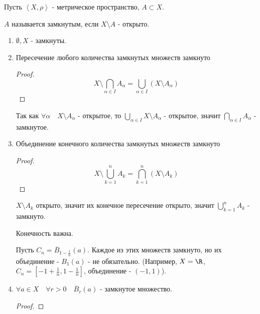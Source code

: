 \begin{definition} \thmslashn 

    Пусть $\left<X, \rho\right>$ - метрическое пространство, $A \subset X$.

    $A$ называется замкнутым, если $X \setminus A$ - открыто. 
\end{definition}
\begin{properties} \thmslashn

    \begin{enumerate}
        \item $ \emptyset, X$ - замкнуты.
        \item Пересечение любого количества замкнутых множеств замкнуто
            \begin{proof} \thmslashn
            
                \begin{equation*}
                        X \setminus \bigcap_{\alpha\in I} A_{\alpha} = \bigcup_{\alpha\in I} (X \setminus A_{\alpha}) 
                \end{equation*}
            \end{proof}

            Так как $\forall{\alpha}\quad X \setminus A_{\alpha}$ - открытое, то $\bigcup_{\alpha\in I} X \setminus A_{\alpha}$ - открытое, значит $\bigcap_{\alpha\in I} A_{\alpha}$ - замкнутое.

        \item Объединение конечного количества замкнутых множеств замкнуто
            \begin{proof} \thmslashn
            
                \begin{equation*}
                    X \setminus \bigcup_{k = 1}^{n} A_{k} = \bigcap_{k = 1}^{n} (X \setminus A_{k})
                \end{equation*}
            \end{proof}

            $X \setminus A_{k}$ открыто, значит их конечное пересечение открыто, значит $\bigcup_{k=1}^{n} A_{k}$ - замкнуто.
            \begin{remark} \thmslashn
            
                Конечность важна.

                Пусть $C_{n} = \overline{B}_{1 - \frac{1}{n}}(a)$. Каждое из этих множеств замкнуто, но их объединение - $B_{1}(a)$ - не обязательно. (Например, $X = \R$, $C_{n} = \left[-1 + \frac{1}{n}, 1 - \frac{1}{n}\right]$, объединение - $(-1, 1)$).
            \end{remark}
        \item $\forall{a\in X}\quad \forall{r > 0}\quad \overline{B}_{r}(a)$ - замкнутое множество.
            \begin{proof} \thmslashn
            

\end{proof}
\end{enumerate}
\end{properties}
